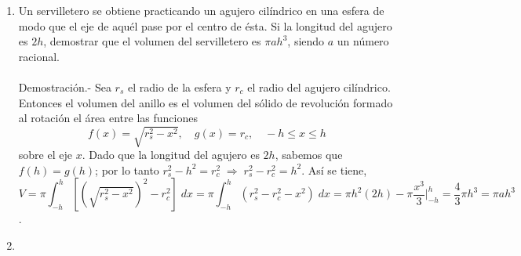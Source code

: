\begin{enumerate}
    \item Un servilletero se obtiene practicando un agujero cilíndrico en una esfera de modo que el eje de aquél pase por el centro de ésta. Si la longitud del agujero es $2h$, demostrar que el volumen del servilletero es $\pi ah^3$, siendo $a$ un número racional.\\\\
	Demostración.-\; Sea $r_s$ el radio de la esfera y $r_c$ el radio del agujero cilíndrico. Entonces el volumen del anillo es el volumen del sólido de revolución formado al rotación el área entre las funciones 
	$$f(x) = \sqrt{r_s^2 - x^2}, \quad g(x)=r_c,\quad -h\leq x\leq h$$
	sobre el eje $x$. Dado que la longitud del agujero es $2h$, sabemos que $f(h)=g(h)$; por lo tanto $r_s^2 - h^2 = r_c^2 \; \Longrightarrow \; r_s^2 - r_c^2 = h^2.$ Así se tiene,
	$$V = \pi\int_{-h}^h \left[\left(\sqrt{r_s^2 - x^2}\right)^2 - r_c^2\right]\; dx = \pi \int_{-h}^h (r_s^2 - r_c^2 -x^2)\; dx = \pi h^2 (2h) - \pi \dfrac{x^3}{3}\bigg|_{-h}^h = \dfrac{4}{3}\pi h^3 = \pi a h^3$$.\\

    \item 




\end{enumerate}



